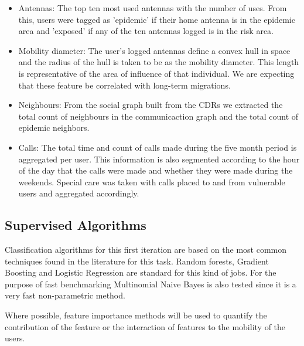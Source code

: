 \begin{itemize}
    \item Antennas: The top ten most used antennas with the number of uses. From this, users were tagged as 'epidemic' if their home antenna is in the epidemic area and 'exposed' if any of the ten antennas logged is in the risk area.
    \item Mobility diameter: The user's logged antennas define a convex hull in space and the radius of the hull is taken to be as the mobility diameter. This length is representative of the area of influence of that individual. We are expecting that these feature be correlated with long-term migrations.
    \item Neighbours: From the social graph built from the CDRs we extracted the total count of neighbours in the communicaction graph and the total count of epidemic neighbors. 
    \item Calls: The total time and count of calls made during the five month period is aggregated per user. This information is also segmented according to the hour of the day that the calls were made and whether they were made during the weekends. Special care was taken with calls placed to and from vulnerable users and aggregated accordingly.
\end{itemize}


\subsection{Supervised Algorithms}

Classification algorithms for this first iteration are based on the most common techniques found in the literature for this task. Random forests, Gradient Boosting and Logistic Regression are standard for this kind of jobs. For the purpose of fast benchmarking Multinomial Naive Bayes is also tested since it is a very fast non-parametric method. 

Where possible, feature importance methods will be used to quantify the contribution of the feature or the interaction of features to the mobility of the users.

